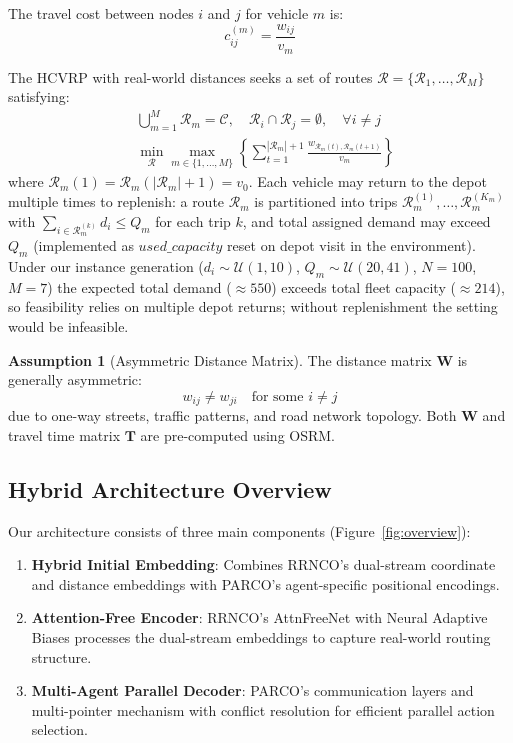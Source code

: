 \documentclass[journal,twoside,web]{ieeecolor}
\theoremstyle{definition}
\theoremstyle{remark}
\theoremstyle{definition}
\newtheorem{assumption}[theorem]{Assumption}
\begin{document}
The travel cost between nodes $i$ and $j$ for vehicle $m$ is:
\begin{equation}
c_{ij}^{(m)} = \frac{w_{ij}}{v_m}
\end{equation}

The HCVRP with real-world distances seeks a set of routes $\mathcal{R} = \{\mathcal{R}_1,\ldots,\mathcal{R}_M\}$ satisfying:
\begin{align}
&\bigcup_{m=1}^M \mathcal{R}_m = \mathcal{C}, \quad \mathcal{R}_i \cap \mathcal{R}_j = \emptyset, \quad \forall i \neq j\\
&\min_{\mathcal{R}} \max_{m \in \{1,\ldots,M\}} \left\{ \sum_{t=1}^{|\mathcal{R}_m|+1} \frac{w_{\mathcal{R}_m(t), \mathcal{R}_m(t+1)}}{v_m} \right\}
\end{align}
where $\mathcal{R}_m(1) = \mathcal{R}_m(|\mathcal{R}_m|+1) = v_0$.
Each vehicle may return to the depot multiple times to replenish: a route $\mathcal{R}_m$ is partitioned into trips $\mathcal{R}_m^{(1)},\ldots,\mathcal{R}_m^{(K_m)}$ with $\sum_{i\in \mathcal{R}_m^{(k)}} d_i \le Q_m$ for each trip $k$, and total assigned demand may exceed $Q_m$ (implemented as $used\_capacity$ reset on depot visit in the environment). Under our instance generation ($d_i\sim\mathcal{U}(1,10)$, $Q_m\sim\mathcal{U}(20,41)$, $N{=}100$, $M{=}7$) the expected total demand ($\approx 550$) exceeds total fleet capacity ($\approx 214$), so feasibility relies on multiple depot returns; without replenishment the setting would be infeasible.

\begin{assumption}[Asymmetric Distance Matrix]
The distance matrix $\mathbf{W}$ is generally asymmetric:
\begin{equation}
w_{ij} \neq w_{ji} \quad \text{for some } i \neq j
\end{equation}
due to one-way streets, traffic patterns, and road network topology. Both $\mathbf{W}$ and travel time matrix $\mathbf{T}$ are pre-computed using OSRM.
\end{assumption}

\subsection{Hybrid Architecture Overview}

Our architecture consists of three main components (Figure~\ref{fig:overview}):
\begin{enumerate}
    \item \textbf{Hybrid Initial Embedding}: Combines RRNCO's dual-stream coordinate and distance embeddings with PARCO's agent-specific positional encodings.
    \item \textbf{Attention-Free Encoder}: RRNCO's AttnFreeNet with Neural Adaptive Biases processes the dual-stream embeddings to capture real-world routing structure.
    \item \textbf{Multi-Agent Parallel Decoder}: PARCO's communication layers and multi-pointer mechanism with conflict resolution for efficient parallel action selection.
\end{enumerate}
\end{document}
